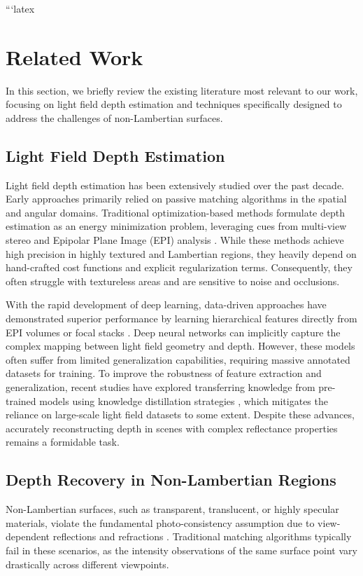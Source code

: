 \documentclass[lettersize,journal]{IEEEtran}
\begin{document}
```latex
\section{Related Work}

In this section, we briefly review the existing literature most relevant to our work, focusing on light field depth estimation and techniques specifically designed to address the challenges of non-Lambertian surfaces.

\subsection{Light Field Depth Estimation}
Light field depth estimation has been extensively studied over the past decade. Early approaches primarily relied on passive matching algorithms in the spatial and angular domains. Traditional optimization-based methods formulate depth estimation as an energy minimization problem, leveraging cues from multi-view stereo  and Epipolar Plane Image (EPI) analysis . While these methods achieve high precision in highly textured and Lambertian regions, they heavily depend on hand-crafted cost functions and explicit regularization terms. Consequently, they often struggle with textureless areas and are sensitive to noise and occlusions. 

With the rapid development of deep learning, data-driven approaches have demonstrated superior performance by learning hierarchical features directly from EPI volumes or focal stacks . Deep neural networks can implicitly capture the complex mapping between light field geometry and depth. However, these models often suffer from limited generalization capabilities, requiring massive annotated datasets for training. To improve the robustness of feature extraction and generalization, recent studies have explored transferring knowledge from pre-trained models using knowledge distillation strategies , which mitigates the reliance on large-scale light field datasets to some extent. Despite these advances, accurately reconstructing depth in scenes with complex reflectance properties remains a formidable task.

\subsection{Depth Recovery in Non-Lambertian Regions}
Non-Lambertian surfaces, such as transparent, translucent, or highly specular materials, violate the fundamental photo-consistency assumption due to view-dependent reflections and refractions . Traditional matching algorithms typically fail in these scenarios, as the intensity observations of the same surface point vary drastically across different viewpoints. 
\end{document}
